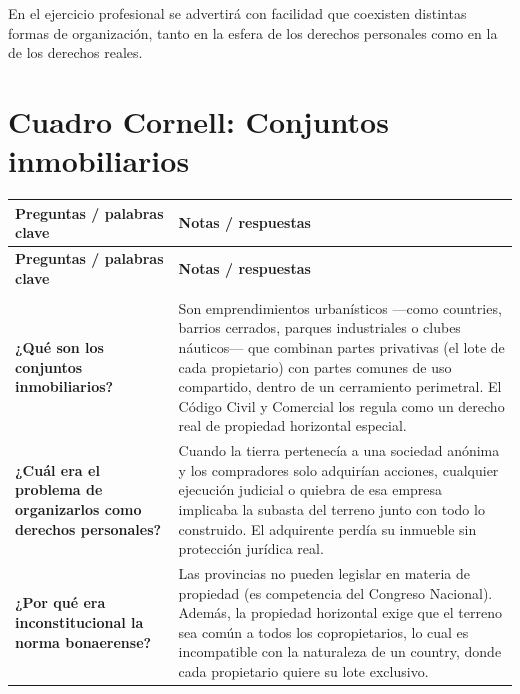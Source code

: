 \documentclass[12pt,oneside]{book}
\begin{document}
En el ejercicio profesional se advertirá con facilidad que coexisten distintas formas de organización, tanto en la esfera de los derechos personales como en la de los derechos reales.

\chapter[Cuadro Cornell]{Cuadro Cornell: Conjuntos inmobiliarios}

\renewcommand{\arraystretch}{1.25}
\begin{longtable}{
    >{\raggedright\arraybackslash}p{}
    >{\raggedright\arraybackslash}p{}
}
\toprule
\textbf{Preguntas / palabras clave} & \textbf{Notas / respuestas} \\
\midrule
\endfirsthead

\toprule
\textbf{Preguntas / palabras clave} & \textbf{Notas / respuestas} \\
\midrule
\endhead

\midrule
\multicolumn{2}{r}{\small\textit{Continúa en la página siguiente}} \\
\endfoot

\bottomrule
\endlastfoot

\textbf{¿Qué son los conjuntos inmobiliarios?} &
Son emprendimientos urbanísticos ---como countries, barrios cerrados, parques industriales o clubes náuticos--- que combinan partes privativas (el lote de cada propietario) con partes comunes de uso compartido, dentro de un cerramiento perimetral. El Código Civil y Comercial los regula como un derecho real de propiedad horizontal especial. \\[0.6em]

\textbf{¿Cuál era el problema de organizarlos como derechos personales?} &
Cuando la tierra pertenecía a una sociedad anónima y los compradores solo adquirían acciones, cualquier ejecución judicial o quiebra de esa empresa implicaba la subasta del terreno junto con todo lo construido. El adquirente perdía su inmueble sin protección jurídica real. \\[0.6em]

\textbf{¿Por qué era inconstitucional la norma bonaerense?} &
Las provincias no pueden legislar en materia de propiedad (es competencia del Congreso Nacional). Además, la propiedad horizontal exige que el terreno sea común a todos los copropietarios, lo cual es incompatible con la naturaleza de un country, donde cada propietario quiere su lote exclusivo. \\[0.6em]


\end{longtable}
\end{document}
